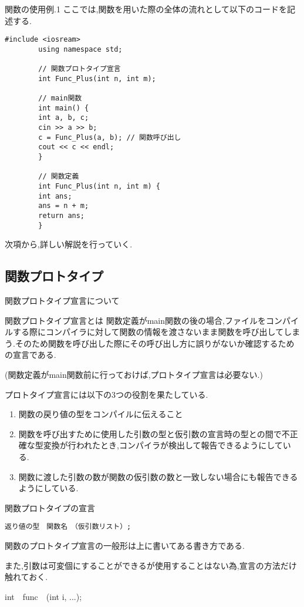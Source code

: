 \documentclass[xdvipdfmx, 8pt, t]{beamer}
\begin{document}
\begin{frame}[fragile]{関数の使用例.1}
    ここでは,関数を用いた際の全体の流れとして以下のコードを記述する.
    \tiny
    \begin{lstlisting}[caption=func.cpp, label=関数使用例]
        #include <iosream>
        using namespace std;

        // 関数プロトタイプ宣言
        int Func_Plus(int n, int m);

        // main関数
        int main() {
        int a, b, c;
        cin >> a >> b;
        c = Func_Plus(a, b); // 関数呼び出し
        cout << c << endl;
        }

        // 関数定義
        int Func_Plus(int n, int m) {
        int ans;
        ans = n + m;
        return ans;
        }
    \end{lstlisting}
    \normalsize
    次項から,詳しい解説を行っていく.
\end{frame}

\subsection{関数プロトタイプ}
\begin{frame}{関数プロトタイプ宣言について}
    \begin{block}{関数プロトタイプ宣言とは}
        関数定義がmain関数の後の場合,ファイルをコンパイルする際にコンパイラに対して関数の情報を渡さないまま関数を呼び出してしまう.そのため関数を呼び出した際にその呼び出し方に誤りがないか確認するための宣言である.

        (関数定義がmain関数前に行っておけば,プロトタイプ宣言は必要ない.)
    \end{block}
    プロトタイプ宣言には以下の3つの役割を果たしている.
    \begin{enumerate}
        \item 関数の戻り値の型をコンパイルに伝えること
        \item 関数を呼び出すために使用した引数の型と仮引数の宣言時の型との間で不正確な型変換が行われたとき,コンパイラが検出して報告できるようにしている.
        \item 関数に渡した引数の数が関数の仮引数の数と一致しない場合にも報告できるようにしている.
    \end{enumerate}
\end{frame}

\begin{frame}[fragile]{関数プロトタイプの宣言}
    \begin{lstlisting}[caption=関数プロトタイプの一般形]
        返り値の型　関数名　（仮引数リスト）;
    \end{lstlisting}
    関数のプロトタイプ宣言の一般形は上に書いてある書き方である.
    
    また,引数は可変個にすることができるが使用することはない為,宣言の方法だけ触れておく.
    \begin{block}{}
        int　func　(int i, ...);
    \end{block}
\end{frame}
\end{document}
